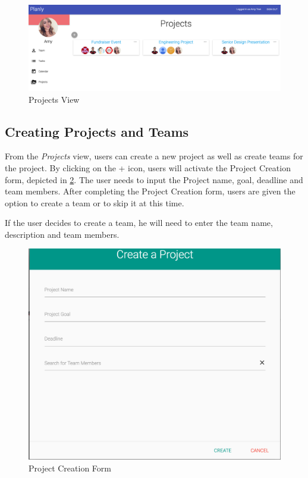 \begin{figure}[ht]
\centering
\includegraphics[width=\textwidth]{figure43.png}
\caption{Projects View}
\label{projectview}
\end{figure}
\FloatBarrier

\subsection{Creating Projects and Teams}
From the \emph{Projects} view, users can create a new project as well as create teams for the project. By clicking on the + icon, users will activate the Project Creation form, depicted in \ref{projectcreationform}. The user needs to input the Project name, goal, deadline and team members. After completing the Project Creation form, users are given the option to create a team or to skip it at this time. 
\par If the user decides to create a team, he will need to enter the team name, description and team members.

\begin{figure}[ht]
\centering
\includegraphics[width=\textwidth]{figure44.png}
\caption{Project Creation Form}
\label{projectcreationform}
\end{figure}
\FloatBarrier

